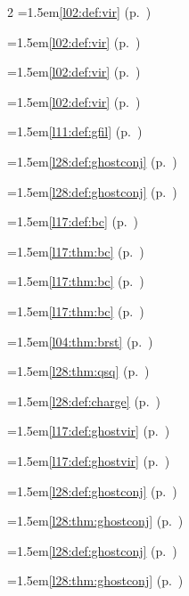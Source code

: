 \begin{multicols}{2}
\hangindent=1.5em\quad \ref{l02:def:vir} (p.~\pageref{l02:def:vir})\par
\hangindent=1.5em\quad \ref{l02:def:vir} (p.~\pageref{l02:def:vir})\par
\hangindent=1.5em\quad \ref{l02:def:vir} (p.~\pageref{l02:def:vir})\par
\hangindent=1.5em\quad \ref{l02:def:vir} (p.~\pageref{l02:def:vir})\par
\hangindent=1.5em\quad \ref{l11:def:gfil} (p.~\pageref{l11:def:gfil})\par
\hangindent=1.5em\quad \ref{l28:def:ghostconj} (p.~\pageref{l28:def:ghostconj})\par
\hangindent=1.5em\quad \ref{l28:def:ghostconj} (p.~\pageref{l28:def:ghostconj})\par
\hangindent=1.5em\quad \ref{l17:def:bc} (p.~\pageref{l17:def:bc})\par
\hangindent=1.5em\quad \ref{l17:thm:bc} (p.~\pageref{l17:thm:bc})\par
\hangindent=1.5em\quad \ref{l17:thm:bc} (p.~\pageref{l17:thm:bc})\par
\hangindent=1.5em\quad \ref{l17:thm:bc} (p.~\pageref{l17:thm:bc})\par
\hangindent=1.5em\quad \ref{l04:thm:brst} (p.~\pageref{l04:thm:brst})\par
\hangindent=1.5em\quad \ref{l28:thm:qsq} (p.~\pageref{l28:thm:qsq})\par
\hangindent=1.5em\quad \ref{l28:def:charge} (p.~\pageref{l28:def:charge})\par
\hangindent=1.5em\quad \ref{l17:def:ghostvir} (p.~\pageref{l17:def:ghostvir})\par
\hangindent=1.5em\quad \ref{l17:def:ghostvir} (p.~\pageref{l17:def:ghostvir})\par
\hangindent=1.5em\quad \ref{l28:def:ghostconj} (p.~\pageref{l28:def:ghostconj})\par
\hangindent=1.5em\quad \ref{l28:thm:ghostconj} (p.~\pageref{l28:thm:ghostconj})\par
\hangindent=1.5em\quad \ref{l28:def:ghostconj} (p.~\pageref{l28:def:ghostconj})\par
\hangindent=1.5em\quad \ref{l28:thm:ghostconj} (p.~\pageref{l28:thm:ghostconj})\par

\end{multicols}
